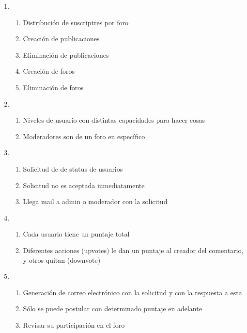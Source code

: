 \documentclass[12pt, letterpaper, notitlepage]{article}
\begin{document}
\begin{enumerate}
		
		
		\item {}
		\begin{enumerate}
			\item Distribución de suscriptres por foro
			\item Creación de publicaciones
			\item Eliminación de publicaciones
			\item Creación de foros
			\item Eliminación de foros
		\end{enumerate}
		
		\item {}
		\begin{enumerate}
			\item Niveles de usuario con distintas capacidades para hacer cosas
			\item Moderadores son de un foro en específico
		\end{enumerate}
		
		\item {}
		\begin{enumerate}
			\item Solicitud de  de status de usuarios
			\item Solicitud no es aceptada inmediatamente
			\item Llega mail a admin o moderador con la solicitud
		\end{enumerate}
		
		\item {}
		\begin{enumerate}
			\item Cada usuario tiene un puntaje total
			\item Diferentes acciones (upvotes) le dan un puntaje al creador del comentario, y otros quitan (downvote)	
		\end{enumerate}
		
		\item {}
		\begin{enumerate}
			\item Generación de correo electrónico con la solicitud y con la respuesta a esta
			\item Sólo se puede postular con determinado puntaje en adelante
			\item Revisar su participación en el foro
		\end{enumerate}
		

\end{enumerate}
\end{document}
